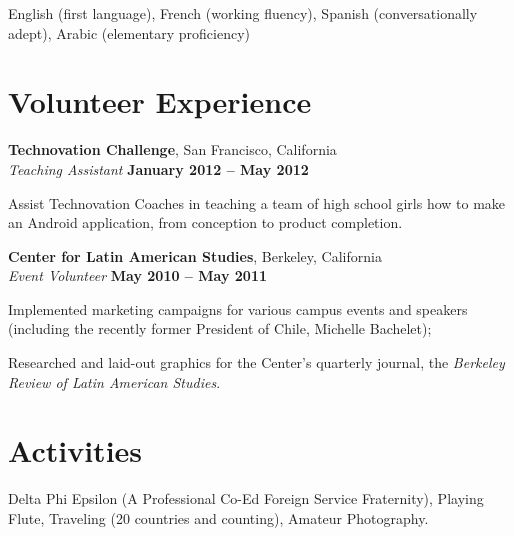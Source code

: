 \documentclass[margin,line]{resume}
\begin{document}
\begin{resume}
	English (first language), French (working fluency), Spanish (conversationally adept), 
	Arabic (elementary proficiency)

	\section{\mysidestyle Volunteer Experience}
	
	\textbf{Technovation Challenge}, San Francisco, California \vspace{1mm}\\\vspace{0mm}%
	\textsl{Teaching Assistant} \hfill \textbf{January 2012 -- May 2012}\vspace{0mm}\vspace{0mm}%
	\begin{list2}
		\item Assist Technovation Coaches in teaching a team of high school girls how to make an Android application, from conception to product completion.
	\end{list2}
	
	\textbf{Center for Latin American Studies}, Berkeley, California \vspace{1mm}\\\vspace{0mm}%
	\textsl{Event Volunteer} \hfill \textbf{May 2010 -- May 2011}\vspace{0mm}\vspace{0mm}%
	\begin{list2}
		\item Implemented marketing campaigns for various campus events and speakers (including the recently former President
	of Chile, Michelle Bachelet); 
		\item Researched and laid-out graphics for the Center's quarterly journal, the \emph{Berkeley Review of
	Latin American Studies}. 
	\end{list2}

	\section{\mysidestyle Activities}

	Delta Phi Epsilon (A Professional Co-Ed Foreign Service Fraternity), Playing Flute,
	Traveling (20 countries and counting), Amateur Photography.


\end{resume}
\end{document}
